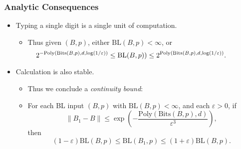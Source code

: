 \documentclass[handout,usenames,dvipsnames,12pt]{beamer}
\begin{document}
\begin{frame}
    \frametitle{Analytic Consequences}

    \begin{itemize}
        \item Typing a single digit is a single unit of computation.

        \pause
        \begin{itemize}
            \item Thus given $(B,p)$, either $\text{BL}(B,p) < \infty$, or
           \[ \hspace{-3em} 2^{-\text{Poly}(\text{Bits}(B,p),d,\log(1/\varepsilon))} \leq \text{BL}(B,p)) \leq 2^{\text{Poly}(\text{Bits}(B,p),d,\log(1/\varepsilon))}. \]
        \end{itemize}

        \pause
        \item Calculation is also stable.

        \pause
        \begin{itemize}
            \item Thus we conclude a \emph{continuity bound}:
            \pause

            \item For each BL input $(B,p)$ with $\text{BL}(B,p) < \infty$, and each $\varepsilon > 0$, \pause if
            \[ \| B_1 - B \| \leq \exp \left( - \frac{\text{Poly}(\text{Bits}(B,p), d)}{\varepsilon^3} \right), \]
            \pause
            then
            \[ (1 - \varepsilon) \text{BL}(B,p) \leq \text{BL}(B_1,p) \leq (1 + \varepsilon) \text{BL}(B,p). \]
        \end{itemize}
    \end{itemize}
\end{frame}




\end{document}
